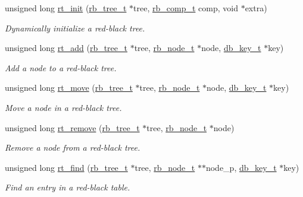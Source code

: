 \begin{CompactItemize}
\item 
unsigned long \hyperlink{group__dbprim__rbtree_a5}{rt\_\-init} (\hyperlink{group__dbprim__rbtree_a0}{rb\_\-tree\_\-t} $\ast$tree, \hyperlink{group__dbprim__rbtree_a3}{rb\_\-comp\_\-t} comp, void $\ast$extra)
\begin{CompactList}\small\item\em Dynamically initialize a red-black tree.\item\end{CompactList}\item 
unsigned long \hyperlink{group__dbprim__rbtree_a6}{rt\_\-add} (\hyperlink{group__dbprim__rbtree_a0}{rb\_\-tree\_\-t} $\ast$tree, \hyperlink{group__dbprim__rbtree_a1}{rb\_\-node\_\-t} $\ast$node, \hyperlink{group__dbprim_a0}{db\_\-key\_\-t} $\ast$key)
\begin{CompactList}\small\item\em Add a node to a red-black tree.\item\end{CompactList}\item 
unsigned long \hyperlink{group__dbprim__rbtree_a7}{rt\_\-move} (\hyperlink{group__dbprim__rbtree_a0}{rb\_\-tree\_\-t} $\ast$tree, \hyperlink{group__dbprim__rbtree_a1}{rb\_\-node\_\-t} $\ast$node, \hyperlink{group__dbprim_a0}{db\_\-key\_\-t} $\ast$key)
\begin{CompactList}\small\item\em Move a node in a red-black tree.\item\end{CompactList}\item 
unsigned long \hyperlink{group__dbprim__rbtree_a8}{rt\_\-remove} (\hyperlink{group__dbprim__rbtree_a0}{rb\_\-tree\_\-t} $\ast$tree, \hyperlink{group__dbprim__rbtree_a1}{rb\_\-node\_\-t} $\ast$node)
\begin{CompactList}\small\item\em Remove a node from a red-black tree.\item\end{CompactList}\item 
unsigned long \hyperlink{group__dbprim__rbtree_a9}{rt\_\-find} (\hyperlink{group__dbprim__rbtree_a0}{rb\_\-tree\_\-t} $\ast$tree, \hyperlink{group__dbprim__rbtree_a1}{rb\_\-node\_\-t} $\ast$$\ast$node\_\-p, \hyperlink{group__dbprim_a0}{db\_\-key\_\-t} $\ast$key)
\begin{CompactList}\small\item\em Find an entry in a red-black table.\item\end{CompactList}\item 
$$
\end{CompactItemize}
